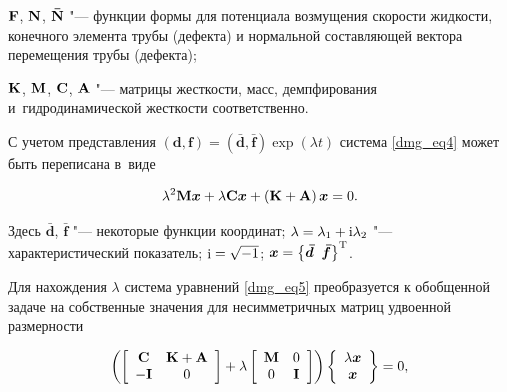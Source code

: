 $\bf{F}$, $\bf{N}$, $\bf{\bar N}$ "--- функции формы для потенциала возмущения скорости жидкости, конечного элемента трубы (дефекта) и нормальной составляющей вектора перемещения трубы (дефекта); 

$\bf{K}$, $\bf{M}$, $\bf{C}$, $\bf{A}$  "--- матрицы жесткости, масс, демпфирования и~гидродинамической жесткости соответственно.



С учетом представления $\left( {{{\boldsymbol {d}}},{\boldsymbol {f}}} \right) = \left( {{{{\boldsymbol {\bar d}}}},{\boldsymbol {\bar f}}} \right)\exp \left( {\lambda t} \right)$  система \eqref{dmg_eq4} может быть переписана в~виде

\begin{equation}

\label{dmg_eq5}

{\lambda ^2}{\bf{M}{\boldsymbol x}} + \lambda {\bf{C}{\boldsymbol x}} + \left( {{\bf{K}} + {\bf{A}}} \right){\boldsymbol {x}} = 0.

\end{equation}

Здесь $\boldsymbol {\bar d}$, $\boldsymbol {\bar f}$ "--- некоторые функции координат; $\lambda  = {\lambda _1} + {\rm{i}}{\lambda _2}$ "--- характеристический показатель; ${\mathop{\rm i}\nolimits}  = \sqrt { - 1}$; ${\boldsymbol {x}} = {\left\{ {{{{\boldsymbol {\bar d}}}}\;\;{\boldsymbol {\bar f}}} \right\}^{\rm{T}}}$.



Для нахождения $\lambda$ система уравнений \eqref{dmg_eq5} преобразуется к обобщенной задаче на собственные значения для несимметричных матриц удвоенной размерности

\begin{equation}

\label{dmg_eq6}

\left( {\left[ {\begin{array}{*{20}{c}}

{\bf{C}}&{{\bf{K}} + {\bf{A}}}\\

{ - {\bf{I}}}&0

\end{array}} \right] + \lambda \left[ {\begin{array}{*{20}{c}}

{\bf{M}}&0\\

0&{\bf{I}}

\end{array}} \right]} \right)\left\{ {\begin{array}{*{20}{c}}

{\lambda {\boldsymbol {x}}}\\

{\boldsymbol {x}}

\end{array}} \right\} = 0,

\end{equation}

